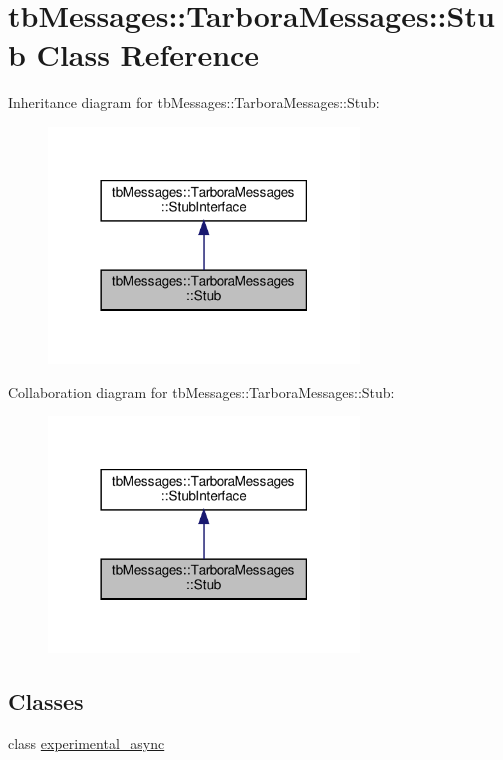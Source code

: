 \hypertarget{classtbMessages_1_1TarboraMessages_1_1Stub}{}\section{tb\+Messages\+:\+:Tarbora\+Messages\+:\+:Stub Class Reference}
\label{classtbMessages_1_1TarboraMessages_1_1Stub}


Inheritance diagram for tb\+Messages\+:\+:Tarbora\+Messages\+:\+:Stub\+:
\nopagebreak
\begin{figure}[H]
\begin{center}
\leavevmode
\includegraphics[width=234pt]{classtbMessages_1_1TarboraMessages_1_1Stub__inherit__graph}
\end{center}
\end{figure}


Collaboration diagram for tb\+Messages\+:\+:Tarbora\+Messages\+:\+:Stub\+:
\nopagebreak
\begin{figure}[H]
\begin{center}
\leavevmode
\includegraphics[width=234pt]{classtbMessages_1_1TarboraMessages_1_1Stub__coll__graph}
\end{center}
\end{figure}
\subsection*{Classes}
\begin{DoxyCompactItemize}
\item 
class \hyperlink{classtbMessages_1_1TarboraMessages_1_1Stub_1_1experimental__async}{experimental\+\_\+async}
\end{DoxyCompactItemize}
